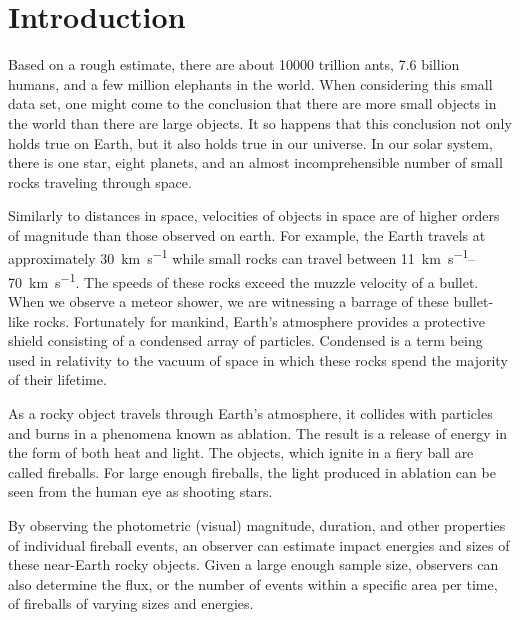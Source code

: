 \chapter{Introduction}

Based on a rough estimate, there are about \num{10000} trillion ants, \num{7.6} billion humans, and a few million elephants in the world.
When considering this small data set, one might come to the conclusion that there are more small objects in the world than there are large objects.
It so happens that this conclusion not only holds true on Earth, but it also holds true in our universe.
In our solar system, there is one star, eight planets, and an almost incomprehensible number of small rocks traveling through space. 

Similarly to distances in space, velocities of objects in space are of higher orders of magnitude than those observed on earth.
For example, the Earth travels at approximately \SI{30}{\kilo\meter\per\second} while small rocks can travel between \SIrange{11}{70}{\kilo\meter\per\second}.  
The speeds of these rocks exceed the muzzle velocity of a bullet.
When we observe a meteor shower, we are witnessing a barrage of these bullet-like rocks.  
Fortunately for mankind, Earth’s atmosphere provides a protective shield consisting of a condensed array of particles.
Condensed is a term being used in relativity to the vacuum of space in which these rocks spend the majority of their lifetime.

As a rocky object travels through Earth’s atmosphere, it collides with particles and burns in a phenomena known as ablation.  
The result is a release of energy in the form of both heat and light.  
The objects, which ignite in a fiery ball are called fireballs. 
For large enough fireballs, the light produced in ablation can be seen from the human eye as shooting stars.

By observing the photometric (visual) magnitude, duration, and other properties of individual fireball events, an observer can estimate impact energies and sizes of these near-Earth rocky objects.
Given a large enough sample size, observers can also determine the flux, or the number of events within a specific area per time, of fireballs of varying sizes and energies.


